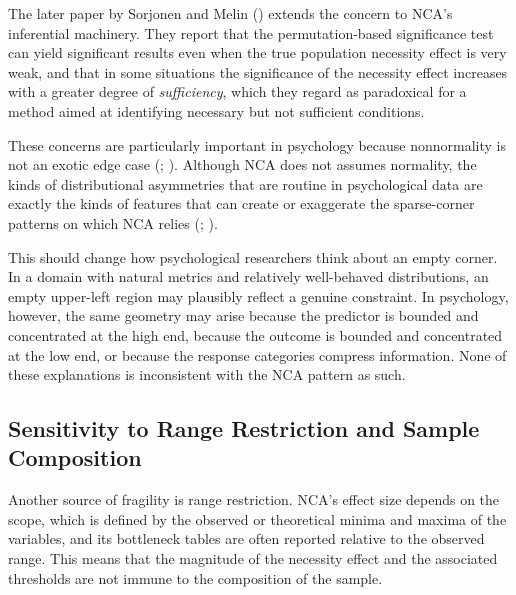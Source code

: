 \documentclass[
  man,
  longtable,
  nolmodern,
  notxfonts,
  notimes,
  colorlinks=true,linkcolor=blue,citecolor=blue,urlcolor=blue]{apa7}
\begin{document}
The later paper by Sorjonen and Melin
() extends the concern to NCA's inferential machinery. They
report that the permutation-based significance test can yield
significant results even when the true population necessity effect is
very weak, and that in some situations the significance of the necessity
effect increases with a greater degree of \emph{sufficiency}, which they
regard as paradoxical for a method aimed at identifying necessary but
not sufficient conditions.

These concerns are particularly important in psychology because
nonnormality is not an exotic edge case
(; ). Although NCA does not assumes normality, the kinds of
distributional asymmetries that are routine in psychological data are
exactly the kinds of features that can create or exaggerate the
sparse-corner patterns on which NCA relies
(;
).

This should change how psychological researchers think about an empty
corner. In a domain with natural metrics and relatively well-behaved
distributions, an empty upper-left region may plausibly reflect a
genuine constraint. In psychology, however, the same geometry may arise
because the predictor is bounded and concentrated at the high end,
because the outcome is bounded and concentrated at the low end, or
because the response categories compress information. None of these
explanations is inconsistent with the NCA pattern as such.

\subsection{Sensitivity to Range Restriction and Sample
Composition}\label{sensitivity-to-range-restriction-and-sample-composition}

Another source of fragility is range restriction. NCA's effect size
depends on the scope, which is defined by the observed or theoretical
minima and maxima of the variables, and its bottleneck tables are often
reported relative to the observed range. This means that the magnitude
of the necessity effect and the associated thresholds are not immune to
the composition of the sample.
\end{document}
